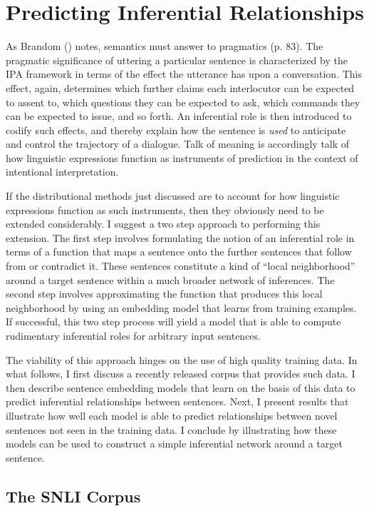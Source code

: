 \section{Predicting Inferential Relationships}

As Brandom (\citeyear{Brandom:1994}) notes, semantics must answer to pragmatics (p. 83). The pragmatic significance of uttering a particular sentence is characterized by the IPA framework in terms of the effect the utterance has upon a conversation. This effect, again, determines which further claims each interlocutor can be expected to assent to, which questions they can be expected to ask, which commands they can be expected to issue, and so forth. An inferential role is then introduced to codify such effects, and thereby explain how the sentence is \textit{used} to anticipate and control the trajectory of a dialogue. Talk of meaning is accordingly talk of how linguistic expressions function as instruments of prediction in the context of intentional interpretation.  

If the distributional methods just discussed are to account for how linguistic expressions function as such instruments, then they obviously need to be extended considerably. I suggest a two step approach to performing this extension. The first step involves formulating the notion of an inferential role in terms of a function that maps a sentence onto the further sentences that follow from or contradict it. These sentences constitute a kind of ``local neighborhood'' around a target sentence within a much broader network of inferences. The second step involves approximating the function that produces this local neighborhood by using an embedding model that learns from training examples. If successful, this two step process will yield a model that is able to compute rudimentary inferential roles for arbitrary input sentences. 

The viability of this approach hinges on the use of high quality training data. In what follows, I first discuss a recently released corpus that provides such data. I then describe sentence embedding models that learn on the basis of this data to predict inferential relationships between sentences. Next, I present results that illustrate how well each model is able to predict relationships between novel sentences not seen in the training data. I conclude by illustrating how these models can be used to construct a simple inferential network around a target sentence.  

\subsection{The SNLI Corpus}

